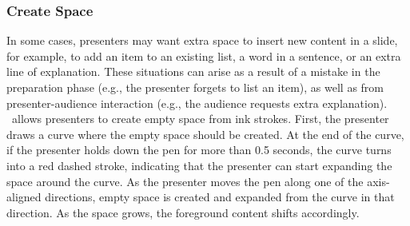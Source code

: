 \subsubsection{Create Space}
In some cases, presenters may want extra space to insert new content in a slide, for example, to add an item to an existing list, a word in a sentence, or an extra line of explanation. These situations can arise as a result of a mistake in the preparation phase (e.g., the presenter forgets to list an item), as well as from presenter-audience interaction (e.g., the audience requests extra explanation). \interface\ allows presenters to create empty space from ink strokes. First, the presenter draws a curve where the empty space should be created. At the end of the curve, if the presenter holds down the pen for more than 0.5 seconds, the curve turns into a red dashed stroke, indicating that the presenter can start expanding the space around the curve. As the presenter moves the pen along one of the axis-aligned directions, empty space is created and expanded from the curve in that direction.  As the space grows, the foreground content shifts accordingly. 
